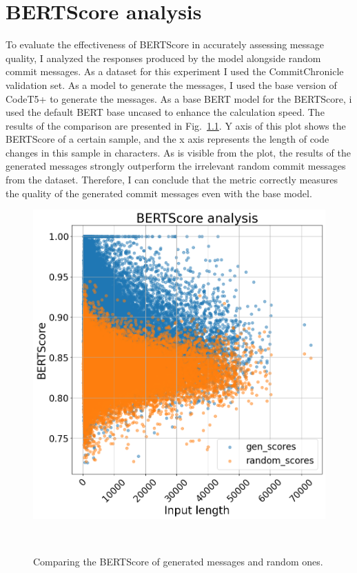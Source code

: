 \appendix
\chapter{BERTScore analysis}\label{chap:bertscore_analysis}
To evaluate the effectiveness of BERTScore in accurately assessing message quality, I analyzed the responses produced by the model alongside random commit messages. As a dataset for this experiment I used the CommitChronicle validation set. As a model to generate the messages, I used the base version of CodeT5+ to generate the messages. As a base BERT model for the BERTScore, i used the default BERT base uncased to enhance the calculation speed.
The results of the comparison are presented in Fig.~\ref{fig:BERTSCORE_analysis}. Y axis of this plot shows the BERTScore of a certain sample, and the x axis represents the length of code changes in this sample in characters. As is visible from the plot, the results of the generated messages strongly outperform the irrelevant random commit messages from the dataset. Therefore, I can conclude that the metric correctly measures the quality of the generated commit messages even with the base model.

\begin{figure}[H]
    \centering
    \includegraphics[scale=0.7]{figs/BERTScore analysis.png}
    \caption{Comparing the BERTScore of generated messages and random ones.}
    ~\label{fig:BERTSCORE_analysis}
\end{figure}

